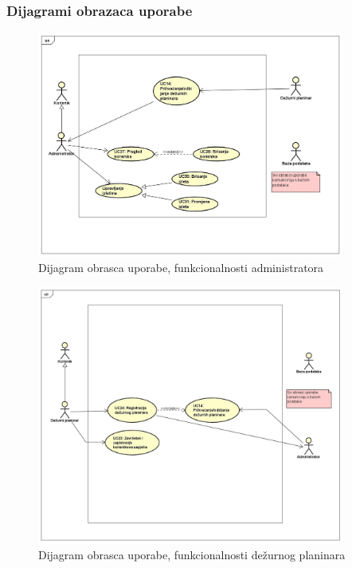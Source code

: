 	
		
		\subsubsection{Dijagrami obrazaca uporabe}
		
			\begin{figure}[H]
				\centering
				\includegraphics[width=0.9\textwidth]{slike/UC-Administrator.jpg}
				\caption{Dijagram obrasca uporabe, funkcionalnosti administratora}
				\label{fig:mesh1}
			\end{figure}
			
			\vspace{10mm}
			
			\begin{figure}[H]
				\centering
				\includegraphics[width=0.9\textwidth]{slike/UC-Dezurni_planinar.jpg}
				\caption{Dijagram obrasca uporabe, funkcionalnosti  dežurnog planinara}
				\label{fig:mesh2}
			\end{figure}
			
